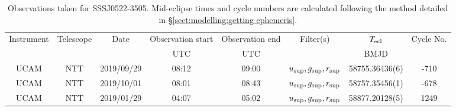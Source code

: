 \begin{table}
	\begin{center}
		\caption{Observations taken for SSSJ0522-3505. Mid-eclipse times and cycle numbers are calculated following the method detailed in \S\ref{sect:modelling:getting ephemeris}.}
		\label{table:observing:observation logs SSSJ0522-3505}
		\begin{tabular}{cccccccc}
			\hline
			Instrument & Telescope & Date & Observation start & Observation end & Filter(s) & $T_{\rm ecl}$ & Cycle No. \\
			 &  &  & UTC & UTC &  & BMJD &  \\
			\hline
			\hline
			UCAM & NTT & 2019/09/29 & 08:12    & 09:00    & $u_{\rm sup},g_{\rm sup},r_{\rm sup}$ & 58755.36436(6)                                                                                                           &                                        -710 \\
			UCAM & NTT & 2019/10/01 & 08:01    & 08:43    & $u_{\rm sup},g_{\rm sup},r_{\rm sup}$ & 58757.35456(1)                                                                                                            &                                        -678 \\
			UCAM & NTT & 2019/01/29 & 04:07    & 05:02    & $u_{\rm sup},g_{\rm sup},r_{\rm sup}$ & 58877.20128(5)                                                                                                            &                                        1249 \\
		   \hline
		\end{tabular}
	\end{center}
\end{table}